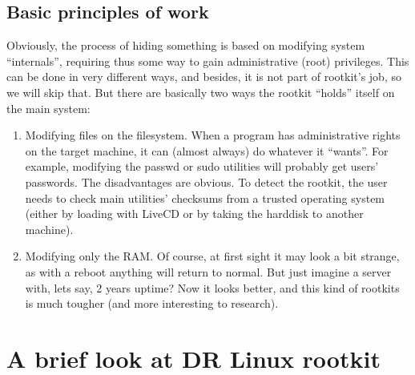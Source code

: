 \documentclass[12pt]{article}
\begin{document}
  \subsection{Basic principles of work}
  Obviously, the process of hiding something is based on modifying system
  ``internals'', requiring thus some way to gain administrative (root)
  privileges. This can be done in very different ways, and besides, it is not
  part of rootkit's job, so we will skip that. But there are basically two
  ways the rootkit ``holds'' itself on the main system:
  \begin{enumerate}
    \item Modifying files on the filesystem. When a program has administrative
      rights on the target machine, it can (almost always) do whatever it
      ``wants''. For example, modifying the passwd or sudo utilities will
      probably get users' passwords. The disadvantages are obvious. To detect
      the rootkit, the user needs to check main utilities' checksums from a
      trusted operating system (either by loading with LiveCD or by taking the
      harddisk to another machine).

    \item Modifying only the RAM. Of course, at first sight it may look a bit
      strange, as with a reboot anything will return to normal. But just
      imagine a server with, lets say, 2 years uptime? Now it looks better,
      and this kind of rootkits is much tougher (and more interesting to
      research).
  \end{enumerate}

  \section{A brief look at DR Linux rootkit}
  
\end{document}
